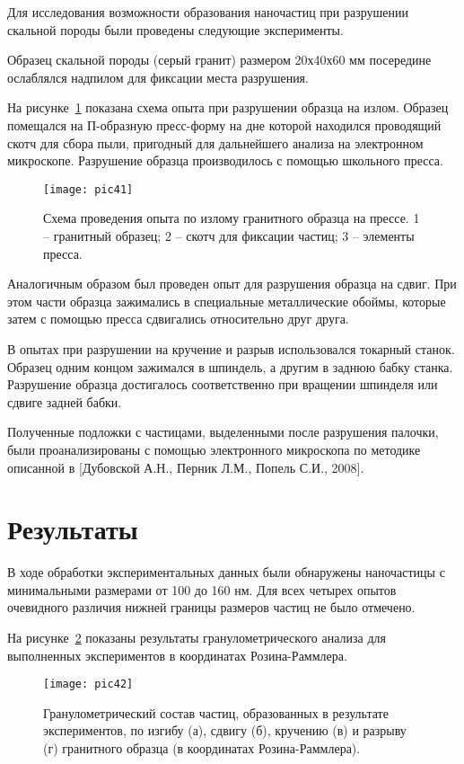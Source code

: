 Для исследования возможности образования наночастиц при разрушении скальной породы были проведены следующие эксперименты. 

Образец скальной породы (серый гранит) размером 20х40х60 мм посередине ослаблялся надпилом для фиксации места разрушения. 

      На рисунке~\ref{img:4scheme} показана схема опыта при разрушении образца на излом. Образец помещался на П-образную пресс-форму на дне которой находился проводящий скотч для сбора пыли, пригодный для дальнейшего анализа на электронном микроскопе. Разрушение образца производилось с помощью школьного пресса.
	  
	  \begin{figure} [h] 
	    \center
	    \texttt{[image: pic41]}
	    \caption{Схема проведения опыта по излому гранитного образца на прессе. 1 – гранитный образец; 2 – скотч для фиксации частиц;  3 – элементы пресса.} 
	    \label{img:4scheme}  
	  \end{figure}
	  
      Аналогичным образом был проведен опыт для разрушения образца на сдвиг. При этом части образца зажимались в специальные металлические обоймы, которые затем с помощью пресса сдвигались относительно друг друга.
	  
     В опытах при разрушении на кручение и разрыв использовался токарный станок. Образец одним концом зажимался в шпиндель, а другим в заднюю бабку станка. Разрушение образца достигалось соответственно при вращении шпинделя или сдвиге задней бабки.
	 
Полученные подложки с частицами, выделенными после разрушения палочки, были проанализированы с помощью электронного микроскопа по методике описанной в [Дубовской А.Н., Перник Л.М., Попель С.И., 2008].


\section{Результаты} \label{sect4_2}

В ходе обработки экспериментальных данных были обнаружены наночастицы с минимальными размерами от 100 до 160 нм. Для всех четырех опытов очевидного различия нижней границы размеров частиц не было отмечено.  

На рисунке~\ref{img:4rr} показаны результаты гранулометрического анализа для выполненных экспериментов в координатах Розина-Раммлера.  

	  \begin{figure} [h] 
	    \center
	    \texttt{[image: pic42]}
	    \caption{Гранулометрический состав частиц, образованных в результате экспериментов, по изгибу (а), сдвигу (б), кручению (в) и разрыву (г) гранитного образца (в координатах Розина-Раммлера).} 
	    \label{img:4rr}  
	  \end{figure}
	  

